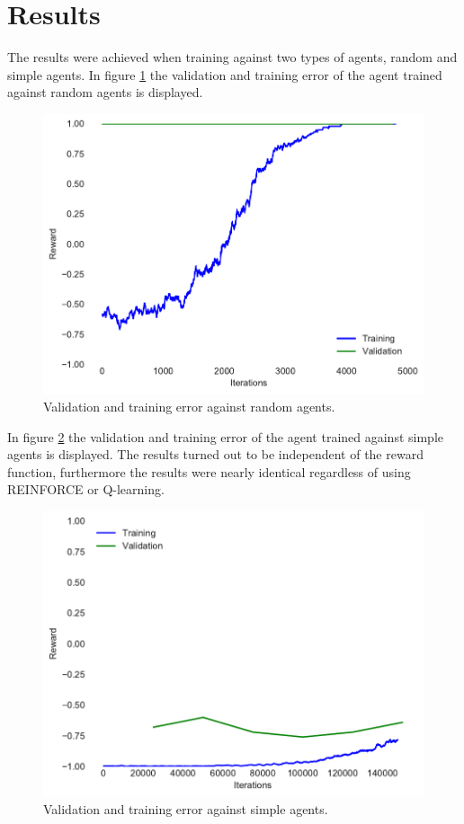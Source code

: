 \section{Results}
The results were achieved when training against two types of agents, random and simple agents. In figure \ref{fig:resultsrandom} the validation and training error of the agent trained against random agents is displayed.

\begin{figure}[htb]
    \centerline{\includegraphics[width=1.0\linewidth]{pommerman/plots/random_train_val.pdf}}
    \caption{Validation and training error against random agents.}\label{fig:resultsrandom}
\end{figure}

In figure \ref{fig:resultssimple} the validation and training error of the agent trained against simple agents is displayed. The results turned out to be independent of the reward function, furthermore the results were nearly identical regardless of using REINFORCE or Q-learning.

\begin{figure}[htb]
    \centerline{\includegraphics[width=1.0\linewidth]{pommerman/plots/train_val.pdf}}
    \caption{Validation and training error against simple agents.}\label{fig:resultssimple}
\end{figure}

